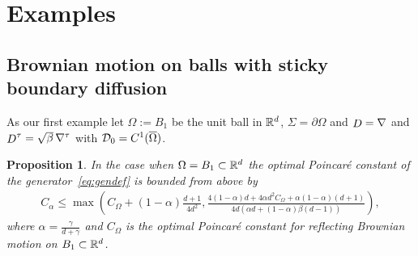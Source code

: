 \documentclass[a4paper]{article}
\newtheorem{proposition}[theorem]{Proposition}
\theoremstyle{definition}
\numberwithin{equation}{section}
\begin{document}
\section{Examples}
\subsection{Brownian motion on balls with sticky  boundary diffusion}
\label{subsec:ball_full}

As our first example let $\Omega:= B_1$ be the unit ball in $\mathbb{R}^d$, $\Sigma=\partial \Omega$ and  $\mathop D=\nabla$ and ${\mathop D}^\tau=\sqrt \beta \, \nabla^\tau$ with $\mathcal {D}_0=C^1(\overline \Omega)$.

\begin{proposition}
\label{prop:example_full_sphere}
In the case when $\Omega=B_1\subset \mathbb{R}^d$ the optimal  Poincaré constant of the generator~\eqref{eq:gendef} is bounded from above by 
\begin{align}
\label{example_full_sphere}
C_\alpha \leq
\max \left(
C_\Omega + (1-\alpha)\frac{d+1}{4d^2},
\frac{4(1-\alpha) d  +4\alpha d^2 C_\Omega +\alpha(1-\alpha)(d+1) }{4d(\alpha d + (1-\alpha) \beta (d-1)) }
\right),
\end{align}
where $\alpha=\frac{\gamma}{d+\gamma}$ and $C_\Omega$ is the optimal Poincaré constant for reflecting Brownian motion on $B_1\subset \mathbb{R}^d$.
\end{proposition}
\end{document}
